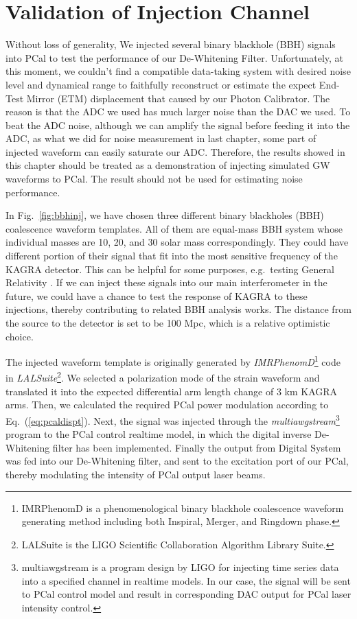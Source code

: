 




\chapter{Validation of Injection Channel}

Without loss of generality, We injected several binary blackhole (BBH) signals into PCal to test the performance of our De-Whitening Filter. Unfortunately, at this moment, we couldn't find a compatible data-taking system with desired noise level and dynamical range to faithfully reconstruct or estimate the expect End-Test Mirror (ETM) displacement that caused by our Photon Calibrator. The reason is that the ADC we used has much larger noise than the DAC we used. To beat the ADC noise, although we can amplify the signal before feeding it into the ADC, as what we did for noise measurement in last chapter, some part of injected waveform can easily saturate our ADC. Therefore, the results showed in this chapter should be treated as a demonstration of injecting simulated GW waveforms to PCal. The result should not be used for estimating noise performance.

In Fig.~\ref{fig:bbhinj}, we have chosen three different binary blackholes (BBH) coalescence waveform templates. All of them are equal-mass BBH system whose individual masses are 10, 20, and 30 solar mass correspondingly. They could have different portion of their signal that fit into the most sensitive frequency of the KAGRA detector. This can be helpful for some purposes, e.g.~testing General Relativity \cite{ligo:o1bbh}. If we can inject these signals into our main interferometer in the future, we could have a chance to test the response of KAGRA to these injections, thereby contributing to related BBH analysis works. The distance from the source to the detector is set to be 100 Mpc, which is a relative optimistic choice.

The injected waveform template is originally generated by \emph{IMRPhenomD}\footnote{IMRPhenomD is a phenomenological binary blackhole coalescence waveform generating method including both Inspiral, Merger, and Ringdown phase.} code in \emph{LALSuite}\footnote{LALSuite is the LIGO Scientific Collaboration Algorithm Library Suite.}. We selected a polarization mode of the strain waveform and translated it into the expected differential arm length change of 3 km KAGRA arms. Then, we calculated the required PCal power modulation according to Eq.~(\ref{eq:pcaldispt}). Next, the signal was injected through the \emph{multiawgstream}\footnote{multiawgstream is a program design by LIGO for injecting time series data into a specified channel in realtime models. In our case, the signal will be sent to PCal control model and result in corresponding DAC output for PCal laser intensity control. } program to the PCal control realtime model, in which the digital inverse De-Whitening filter has been implemented. Finally the output from Digital System was fed into our De-Whitening filter, and sent to the excitation port of our PCal, thereby modulating the intensity of PCal output laser beams. 


